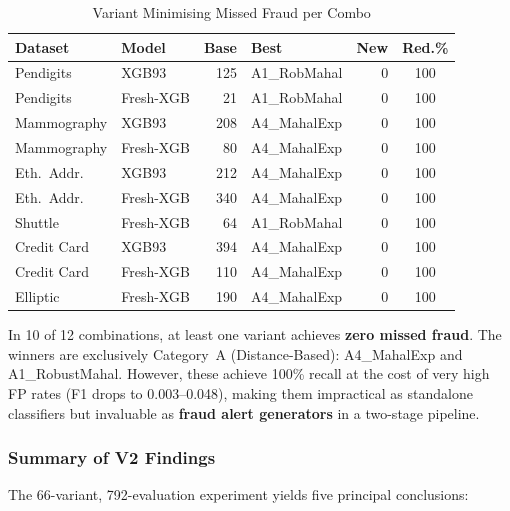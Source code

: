 \documentclass[journal]{IEEEtran}
\begin{document}
\begin{table}[!t]
\centering
\caption{Variant Minimising Missed Fraud per Combo}
\label{tab:missed_best}
\setlength{\tabcolsep}{3pt}
\begin{tabular}{@{}llrlrc@{}}
\toprule
\textbf{Dataset} & \textbf{Model} & \textbf{Base} & \textbf{Best} & \textbf{New} & \textbf{Red.\%} \\
\midrule
Pendigits  & XGB93     & 125 & A1\_RobMahal & 0 & 100 \\
Pendigits  & Fresh-XGB & 21  & A1\_RobMahal & 0 & 100 \\
Mammography & XGB93    & 208 & A4\_MahalExp & 0 & 100 \\
Mammography & Fresh-XGB & 80 & A4\_MahalExp & 0 & 100 \\
Eth.\ Addr. & XGB93     & 212 & A4\_MahalExp & 0 & 100 \\
Eth.\ Addr. & Fresh-XGB & 340 & A4\_MahalExp & 0 & 100 \\
Shuttle    & Fresh-XGB & 64  & A1\_RobMahal & 0 & 100 \\
Credit Card & XGB93    & 394 & A4\_MahalExp & 0 & 100 \\
Credit Card & Fresh-XGB & 110 & A4\_MahalExp & 0 & 100 \\
Elliptic   & Fresh-XGB & 190 & A4\_MahalExp & 0 & 100 \\
\bottomrule
\end{tabular}
\end{table}

In 10 of 12 combinations, at least one variant achieves \textbf{zero missed fraud}. The winners are exclusively Category~A (Distance-Based): A4\_MahalExp and A1\_RobustMahal. However, these achieve 100\% recall at the cost of very high FP rates (F1 drops to 0.003--0.048), making them impractical as standalone classifiers but invaluable as \textbf{fraud alert generators} in a two-stage pipeline.

\subsubsection{Summary of V2 Findings}

The 66-variant, 792-evaluation experiment yields five principal conclusions:
\end{document}
